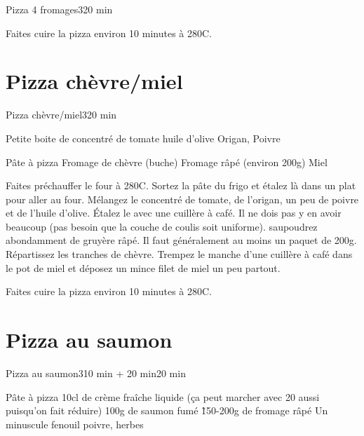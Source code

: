 {\begin{recette}{Pizza 4 fromages}{3}{}{20 min}
\begin{cuisson}
Faites cuire la pizza environ 10 minutes à 280\degres C.
\end{cuisson}
\end{recette}

\section{Pizza chèvre/miel}
\begin{recette}{Pizza chèvre/miel}{3}{}{20 min}

\begin{ingredients}
\ingredient Petite boite de concentré de tomate
\ingredient huile d'olive
\ingredient Origan, Poivre

\ingredient Pâte à pizza
\ingredient Fromage de chèvre (buche)
\ingredient Fromage râpé (environ 200g)
\ingredient Miel
\end{ingredients}

\begin{preparation}
\etape Faites préchauffer le four à 280\degres C.
\etape Sortez la pâte du frigo et étalez là dans un plat pour aller au four.
\etape Mélangez le concentré de tomate, de l'origan, un peu de poivre et de l'huile d'olive.
\etape Étalez le avec une cuillère à café. Il ne dois pas y en avoir beaucoup (pas besoin que la couche de coulis soit 
uniforme).
\etape saupoudrez abondamment de gruyère râpé. Il faut généralement au moins un paquet de 200g. 
\etape Répartissez les tranches de chèvre. 
\etape Trempez le manche d'une cuillère à café dans le pot de miel et déposez un mince filet de miel un peu partout.
\end{preparation}

\begin{cuisson}
Faites cuire la pizza environ 10 minutes à 280\degres C.
\end{cuisson}
\end{recette}

\section{Pizza au saumon}
\begin{recette}{Pizza au saumon}{3}{10 min + 20 min}{20 min}
\begin{ingredients}
\ingredient Pâte à pizza
\ingredient 10cl de crème fraîche liquide (ça peut marcher avec 20 aussi puisqu'on fait réduire)
\ingredient 100g de saumon fumé
\ingredient \~ 150-200g de fromage râpé
\ingredient Un minuscule fenouil
\ingredient poivre, herbes
\end{ingredients}


\end{recette}}
